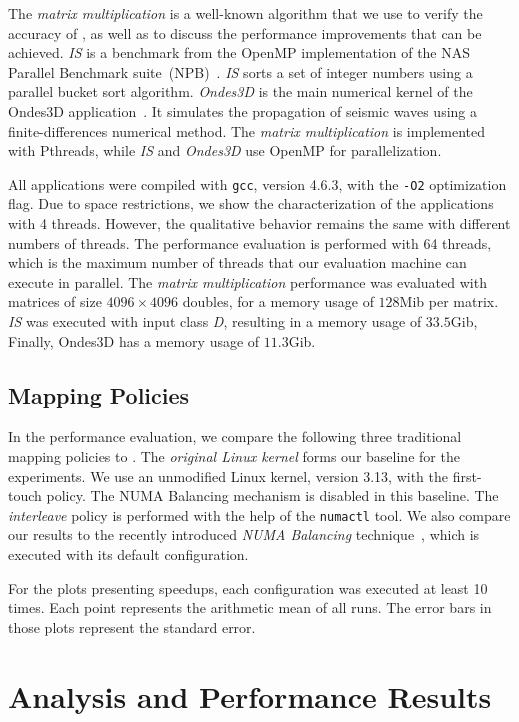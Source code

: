 The \emph{matrix multiplication} is a well-known algorithm that we use to verify the accuracy of \TABARNAC, as well as to discuss the performance improvements that can be achieved.
\emph{IS} is a benchmark from the OpenMP implementation of the NAS Parallel Benchmark suite~(NPB)~\cite{Jin1999}. \emph{IS} sorts a set of integer numbers using a parallel bucket sort algorithm.
\emph{Ondes3D} is the main numerical kernel of the Ondes3D application~\cite{Dupros2008}. It simulates the propagation of seismic waves using a finite-differences numerical method.
The \emph{matrix multiplication} is implemented with Pthreads, while \emph{IS} and \emph{Ondes3D} use OpenMP for parallelization.

All applications were compiled with \texttt{gcc}, version 4.6.3, with the \texttt{-O2} optimization flag.
Due to space restrictions, we show the characterization of the applications
with 4 threads. However, the qualitative behavior remains the same with different numbers of threads. The performance evaluation is performed with 64 threads,
which is the maximum number of threads that our evaluation machine can execute
in parallel. The \emph{matrix multiplication} performance was evaluated with
matrices of size $4096 \times 4096$ doubles, for a memory usage of $128$Mib per matrix. \emph{IS} was executed
with input class \emph{D}, resulting in a memory usage of $33.5$Gib, Finally, Ondes3D has a memory usage of $11.3$Gib.

\subsection{Mapping Policies}

In the performance evaluation, we compare the following three traditional mapping policies to \TABARNAC.
The \emph{original Linux kernel} forms our baseline for the experiments. We use an unmodified Linux kernel, version 3.13, with the first-touch policy. The NUMA Balancing mechanism is disabled in this baseline.
The \emph{interleave} policy is performed with the help of the \texttt{numactl} tool.
We also compare our results to the recently introduced \emph{NUMA Balancing} technique~\cite{Corbet}, which is executed with its default configuration.

For the plots presenting speedups, each configuration was executed at least 10 times. Each point represents the arithmetic mean of all runs.
The error bars in those plots represent the standard error.


\section{Analysis and Performance Results}
\label{sec:expe-analysis}

